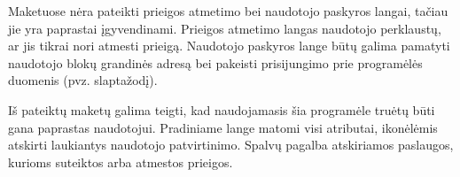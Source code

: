 Maketuose nėra pateikti prieigos atmetimo bei naudotojo paskyros langai, tačiau jie yra paprastai įgyvendinami. Prieigos atmetimo langas
naudotojo perklaustų, ar jis tikrai nori atmesti prieigą. Naudotojo paskyros lange būtų galima pamatyti naudotojo blokų grandinės
adresą bei pakeisti prisijungimo prie programėlės duomenis (pvz. slaptažodį).

Iš pateiktų maketų galima teigti, kad naudojamasis šia programėle truėtų būti gana paprastas naudotojui. Pradiniame lange matomi visi
atributai, ikonėlėmis atskirti laukiantys naudotojo patvirtinimo. Spalvų pagalba atskiriamos paslaugos, kurioms suteiktos arba atmestos prieigos.